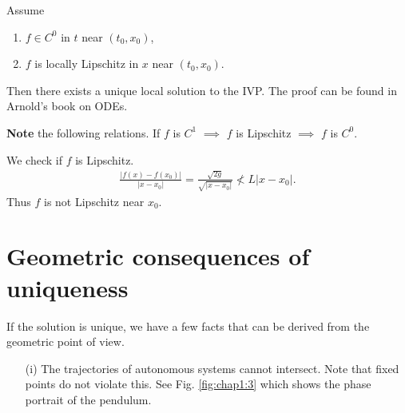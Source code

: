 \begin{theorem}[Picard]
	Assume 
	\begin{enumerate}
		\item  $f \in C^0$ in $t$ near $(t_0, x_0)$,
		\item $f$ is locally Lipschitz in $x$ near $(t_0, x_0)$.
	\end{enumerate}
	Then there exists a unique local solution to the IVP. The proof can be found in Arnold's book on ODEs.  	
\end{theorem}
\textbf{Note} the following relations. If $f$ is $C^1$ $\implies$ $f $ is Lipschitz $\implies $ $f$ is $C^0$. 
\begin{ex}
	We check if $f$ is Lipschitz.
	\begin{align}
		\frac{| f(x) - f(x_0) |}{|x-x_0|} = \frac{\sqrt{2g}}{\sqrt{|x-x_0|}} \not< L | x - x_0|.
	\end{align}
Thus $f$ is not Lipschitz near $x_0$.	
\end{ex}

\section{Geometric consequences of uniqueness}
If the solution is unique, we have a few facts that can be derived from the geometric point of view.
\begin{itemize}
	\item[(i)] The trajectories of autonomous systems cannot intersect. Note that fixed points do not violate this. See Fig. \ref{fig:chap1:3} which shows the phase portrait of the pendulum. 
	\end{itemize}

